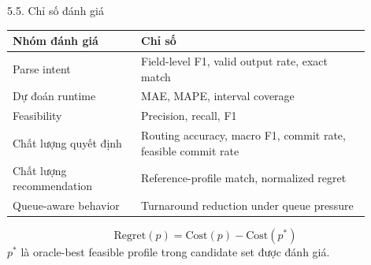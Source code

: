 \begin{frame}[t,shrink=10]{5.5. Chỉ số đánh giá}
\scriptsize
\centering
\begin{tabular}{p{0.32\linewidth}p{0.58\linewidth}}
\toprule
\textbf{Nhóm đánh giá} & \textbf{Chỉ số} \\
\midrule
Parse intent & Field-level F1, valid output rate, exact match \\
Dự đoán runtime & MAE, MAPE, interval coverage \\
Feasibility & Precision, recall, F1 \\
Chất lượng quyết định & Routing accuracy, macro F1, commit rate, feasible commit rate \\
Chất lượng recommendation & Reference-profile match, normalized regret \\
Queue-aware behavior & Turnaround reduction under queue pressure \\
\bottomrule
\end{tabular}
\vspace{0.3cm}
\[
\mathrm{Regret}(p)=\mathrm{Cost}(p)-\mathrm{Cost}(p^*)
\]
\small
$p^*$ là oracle-best feasible profile trong candidate set được đánh giá.
\end{frame}
